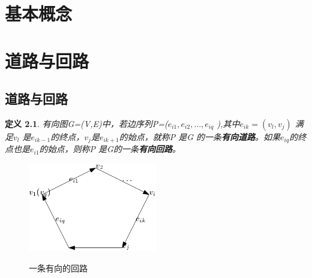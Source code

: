 \documentclass[a4paper,11pt]{book}
\newtheorem{defination}{\textbf{定义}}[section]
\begin{document}
\pagestyle{plain}  %
\chapter{基本概念}
\chapter{道路与回路}
\section{道路与回路}
\begin{defination}\K 有向图G=(V,E)中，若边序列P=($e_{i1},e_{i2},\dots,e_{iq}$ ),其中$e_{ik}=(v_l,v_j )$ 满足$v_l$ 是$e_{ik-1}$的终点，$v_j$是$e_{ik+1}$的始点，就称P 是G 的一条\textbf{有向道路}。如果$e_{iq}$的终点也是$e_{i1}$的始点，则称P 是G的一条\textbf{有向回路}。
\end{defination}
\begin{figure}[H]
  \centering
  \includegraphics[width=0.5\textwidth]{2.1.1.png}\\
  \caption*{一条有向的回路}
\end{figure}
\end{document}
